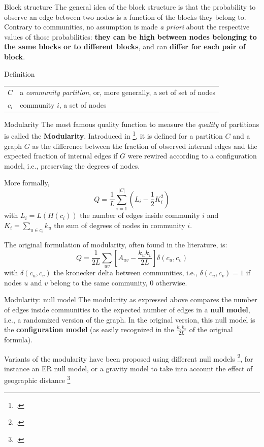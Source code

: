 \documentclass[a4paper,11pt]{book}
\begin{document}
\begin{textbox}{Block structure}
The general idea of the block structure is that the probability to observe an edge between two nodes is a function of the blocks they belong to. Contrary to communities, no assumption is made \textit{a priori} about the respective values of those probabilities: \textbf{they can be high between nodes belonging to the same blocks or to different blocks}, and can \textbf{differ for each pair of block}.

\end{textbox}





\begin{textbox}{Definition}
\begin{tabular}{p{}|p{}}\scriptsize

$C$ & a \textit{community partition}, or, more generally, a set of set of nodes \\
$c_i$ & community $i$, a set of nodes \\
\end{tabular}
\end{textbox}


\begin{textbox}{Modularity}
The most famous quality function to measure the \textit{quality} of partitions is called the \textbf{Modularity}. Introduced in \footcite{girvan2002community}, it is defined for a partition $C$ and a graph $G$ as the difference between the fraction of observed internal edges and the expected fraction of internal edges if $G$ were rewired according to a configuration model, i.e., preserving the degrees of nodes.

More formally, 
\[
Q=\frac{1}{L}\sum_{i=1}^{|C|}(L_{i}-\frac{1}{2}K_i^2)
\]
with $L_{i}=L(H(c_i))$ the number of edges inside community $i$ and $K_i=\sum_{u \in c_i}k_u$ the sum of degrees of nodes in community $i$.

The original formulation of modularity, often found in the literature, is:
\[
Q=\frac{1}{2L}\sum_{uv}\left[ A_{uv}-\frac{k_uk_v}{2L}\right] \delta(c_u,c_v)
\]
with $\delta(c_u,c_v)$ the kronecker delta between communities, i.e., $\delta(c_u,c_v)=1$ if nodes $u$ and $v$ belong to the same community, 0 otherwise.


\end{textbox}

\begin{textbox}{Modularity: null model}
The modularity as expressed above compares the number of edges inside communities to the expected number of edges in a \textbf{null model}, i.e., a randomized version of the graph. In the original version, this null model is the \textbf{configuration model} (as easily recognized in the $\frac{k_uk_v}{2L}$ of the original formula).

Variants of the modularity have been proposed using different null models \footcite{jutla2011generalized}, for instance an ER null model, or a gravity model to take into account the effect of geographic distance \footcite{expert2011uncovering}
\end{textbox}
\end{document}
